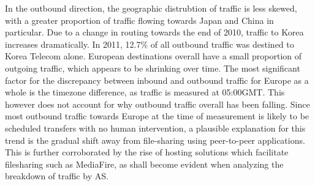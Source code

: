 In the outbound direction, the geographic distrubtion of traffic is less skewed, with a greater proportion of traffic flowing towards Japan and China in particular. Due to a change in routing towards the end of 2010, traffic to Korea increases dramatically. In 2011, 12.7\% of all outbound traffic was destined to Korea Telecom alone. European destinations overall have a small proportion of outgoing traffic, which appears to be shrinking over time. The most significant factor for the discrepancy between inbound and outbound traffic for Europe as a whole is the timezone difference, as traffic is measured at 05:00GMT. This however does not account for why outbound traffic overall has been falling. Since most outbound traffic towards Europe at the time of measurement is likely to be scheduled transfers with no human intervention, a plausible explanation for this trend is the gradual shift away from file-sharing using peer-to-peer applications. This is further corroborated by the rise of hosting solutions which facilitate filesharing such as MediaFire, as shall become evident when analyzing the breakdown of traffic by AS.


\


